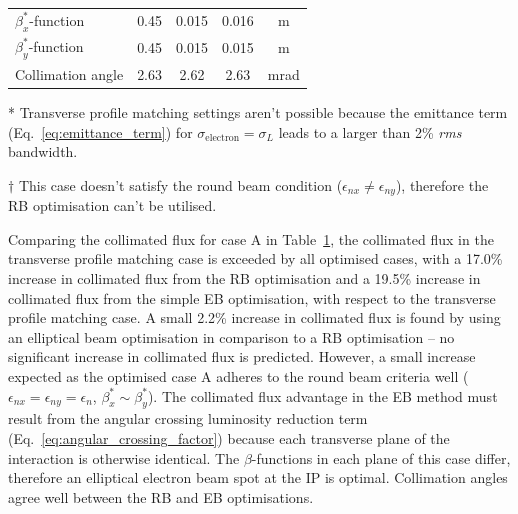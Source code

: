 \documentclass[../main.tex]{subfiles}
\begin{document}
\begin{table}[!h]
\begin{threeparttable}
\begin{tabular}{lcccc}
$\beta_{x}^{*}$-function & 0.45 & 0.015 & 0.016 & \si{\meter} \\
$\beta_{y}^{*}$-function & 0.45 & 0.015 & 0.015 & \si{\meter} \\
Collimation angle & 2.63 & 2.62 & 2.63 & \si{\milli\radian}\\
\hline\hline
\end{tabular}
\begin{tablenotes}
\item[*]{Transverse profile matching settings aren't possible because the emittance term (Eq.~\ref{eq:emittance_term}) for $\sigma_{\mathrm{electron}} = \sigma_{L}$ leads to a larger than 2\% \textit{rms} bandwidth.}
\item[$\dagger$]{This case doesn't satisfy the round beam condition ($\epsilon_{nx} \neq \epsilon_{ny}$), therefore the RB optimisation can't be utilised.}
\end{tablenotes}
\end{threeparttable}
\label{tab:single_point_optimisations}
\end{table}

Comparing the collimated flux for case A in Table~\ref{tab:single_point_optimisations}, the collimated flux in the transverse profile matching case is exceeded by all optimised cases, with a 17.0\% increase in collimated flux from the RB optimisation and a 19.5\% increase in collimated flux from the simple EB optimisation, with respect to the transverse profile matching case. A small 2.2\% increase in collimated flux is found by using an elliptical beam optimisation in comparison to a RB optimisation -- no significant increase in collimated flux is predicted. However, a small increase expected as the optimised case A adheres to the round beam criteria well ($\epsilon_{nx}=\epsilon_{ny}=\epsilon_{n}$, $\beta_{x}^{*}\sim\beta_{y}^{*}$). The collimated flux advantage in the EB method must result from the angular crossing luminosity reduction term (Eq.~\ref{eq:angular_crossing_factor}) because each transverse plane of the interaction is otherwise identical. The $\beta$-functions in each plane of this case differ, therefore an elliptical electron beam spot at the IP is optimal. Collimation angles agree well between the RB and EB optimisations.
\end{document}

